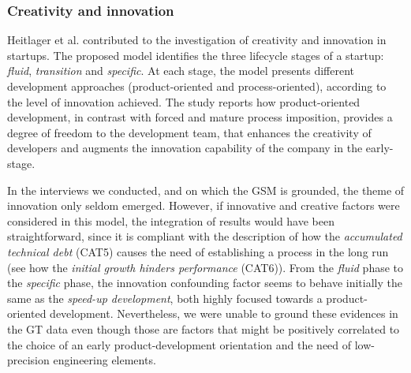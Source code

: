 \documentclass[10pt,journal,letterpaper,compsoc]{IEEEtran}
\begin{document}
\subsubsection{Creativity and innovation} 
Heitlager et al. \cite{Heitlager2007} contributed to the investigation of 
creativity and innovation in startups. 
The proposed model identifies the three lifecycle stages of a startup: 
\textit{fluid}, \textit{transition} and \textit{specific}. At each stage, the 
model presents different development approaches (product-oriented and 
process-oriented), according to the level of innovation achieved. The study 
reports how product-oriented development, in contrast with forced and mature 
process imposition, provides a degree of freedom to the development team, that 
enhances the creativity of developers and augments the innovation capability of 
the company in the early-stage.


In the interviews we conducted, and on which the GSM is grounded, the theme of 
innovation only seldom emerged. However, if innovative and creative factors were 
considered in this model, the integration of results would have been 
straightforward, since it is compliant with the description of how the 
\textit{accumulated technical debt} (CAT5) causes the need of establishing a 
process in the long run (see how the \textit{initial growth hinders performance} 
(CAT6)). %
From the \textit{fluid} phase to the \textit{specific} phase, the innovation 
confounding factor seems to behave initially the same as the \textit{speed-up 
development}, both highly focused towards a product-oriented development. 
Nevertheless, we were unable to ground these evidences in the GT data even 
though those are factors that might be positively correlated 
to the choice of an early product-development orientation and the need of 
low-precision engineering elements.
\end{document}
